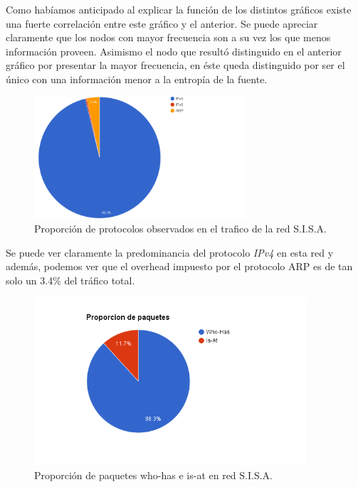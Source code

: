 Como habíamos anticipado al explicar la función de los distintos gráficos existe una fuerte correlación entre este gráfico y el anterior. Se puede apreciar
claramente que los nodos con mayor frecuencia son a su vez los que menos información proveen. Asimismo el nodo que resultó distinguido en el anterior gráfico por
presentar la mayor frecuencia, en éste queda distinguido por ser el único con una información menor a la entropía de la fuente.

\begin{figure}[H]
  \centering
    \includegraphics[width=0.7\textwidth]{imagenes/sisa/proporcion_protocolos.png}
  \caption{Proporción de protocolos observados en el trafico de la red S.I.S.A.}
  \label{fig:ejemplo}
\end{figure}

Se puede ver claramente la predominancia del protocolo \textit{IPv4} en esta red y además, podemos ver que el overhead impuesto por el protocolo ARP es de tan solo un 3.4\% del tráfico total.

\begin{figure}[H]
  \centering
    \includegraphics[width=0.9\textwidth]{imagenes/sisa/proporcion_paquetes_arp.png}
  \caption{Proporción de paquetes who-has e is-at en red S.I.S.A.}
  \label{fig:ejemplo}
\end{figure}

